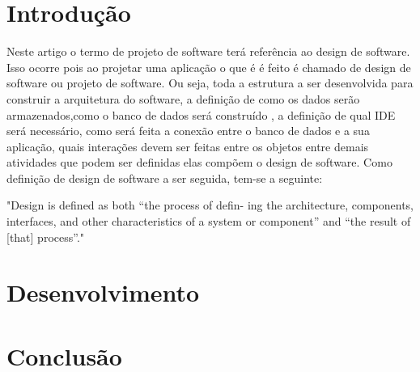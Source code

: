 \documentclass[conference]{IEEEtran}
\begin{document}
\section{Introdução}
Neste artigo o termo de projeto de software terá referência ao design de software. Isso ocorre pois ao projetar uma aplicação o que é é feito  é chamado de design de software ou projeto de software. Ou seja, toda a estrutura a ser desenvolvida para construir a arquitetura do software, a definição de como os dados serão armazenados,como o banco de dados será construído , a definição de qual IDE será necessário, como será feita a conexão entre o banco de dados e a sua aplicação, quais interações devem ser feitas entre os objetos entre demais atividades que podem ser definidas elas compõem o design de software. Como definição de design de software a ser seguida, tem-se a seguinte: 
  
    "Design is defined as both “the process of defin-
    ing the architecture, components, interfaces, and
    other characteristics of a system or component”
    and “the result of [that] process”."~\cite{SWEBOK2014}

\section{Desenvolvimento}

\section{Conclusão}



{\small



}
\end{document}
